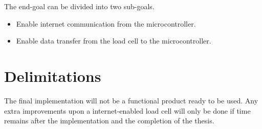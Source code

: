 The end-goal can be divided into two sub-goals. 
\begin{itemize}
	\item Enable internet communication from the microcontroller.
	\item Enable data transfer from the load cell to the microcontroller.
\end{itemize}


\section{Delimitations}
\iffalse
\begin{itemize}
	\item Scale down expectations and clarify
\end{itemize}
\fi
The final implementation will not be a functional product ready to be used. Any extra improvements upon a internet-enabled load cell will only be done if time remains after the implementation and the completion of the thesis.